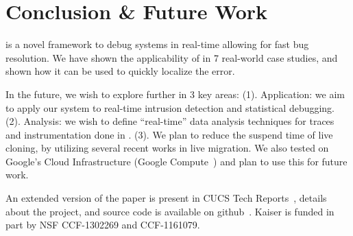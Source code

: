 
\vspace{-2mm}
\section{Conclusion \& Future Work}
\label{sec:conclusion}


\parikshan is a novel framework to debug systems in real-time allowing for fast bug resolution.
We have shown the applicability of \parikshan in  7 real-world case studies, and shown how it can be used to quickly localize the error.

In the future, we wish to explore \parikshan further in 3 key areas: (1). Application: we aim to apply our system to real-time intrusion detection and statistical debugging.
(2). Analysis: we wish to define ``real-time'' data analysis techniques for traces and instrumentation done in \parikshan.
(3). We plan to reduce the suspend time of live cloning, by utilizing several recent works in live migration.
We also tested \parikshan on Google's Cloud Infrastructure (Google Compute~\cite{gcompute}) and plan to use this for future work. 

An extended version of the paper is present in CUCS Tech Reports~\cite{parikshanTR,parikshanQueue}, details about the project, and source code is available on github~\cite{github}. 
Kaiser is funded in part by NSF CCF-1302269 and CCF-1161079.
